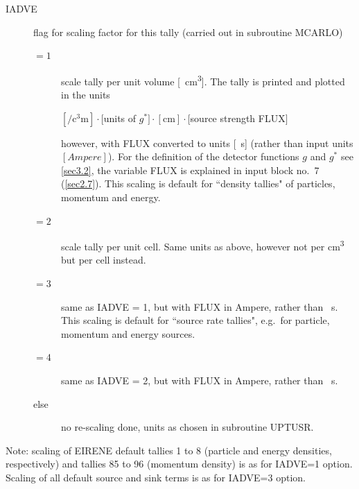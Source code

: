 \begin{description}
  \item[IADVE] flag for scaling factor for this tally
        (carried out in subroutine MCARLO)
        \begin{description}
          \item[$= 1$] scale tally
                per unit volume [\si{\per\cubic\centi\metre}].
                The tally is printed and plotted in the units 

                $[\si{\per\cubic\centi\metre}] \cdot [$units of $g^*] \cdot [\si{\centi\metre}]
                  \cdot [$source strength FLUX$]$ 

                however, with FLUX converted to units [\si{\per\second}] (rather than input
                units $[Ampere]$).
                For the definition of the detector functions $g$ and $g^*$ see \cref{sec3.2},
                the variable FLUX is explained in input block no.\ 7 (\cref{sec2.7}).
                This scaling is default for ``density tallies" of particles, momentum and
                energy.
          \item[$= 2$] scale tally per unit cell.
                Same units as above, however not per \si{\cubic\centi\metre} but per cell
                instead.
          \item[$= 3$] same as IADVE = 1, but with FLUX in Ampere, rather than
                \si{\per\second}.
                This scaling is default for ``source rate tallies", e.g.\ for particle,
                momentum and energy sources.
          \item[$= 4$] same as IADVE = 2, but with FLUX in Ampere, rather than
                \si{\per\second}.
          \item[else] no re-scaling done, units as chosen in subroutine UPTUSR.
        \end{description}
\end{description}
Note: scaling of EIRENE default tallies 1 to 8 (particle and energy densities,
respectively) and tallies 85 to 96 (momentum density) is as for IADVE=1 option.
Scaling of all default source and sink terms is as for IADVE=3 option.

